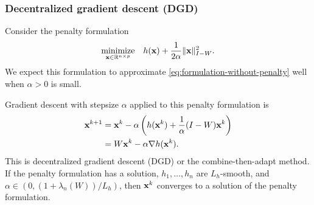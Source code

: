\documentclass[10pt,mathserif]{beamer}
\begin{document}
\begin{frame}
\frametitle{Decentralized gradient descent (DGD)}
Consider the penalty formulation
\[
\begin{array}{ll}
\underset{{\mathbf{x}}\in\mathbb{R}^{n\times p}}{\mbox{minimize}} &\displaystyle{h({\mathbf{x}}) + \frac{1}{2\alpha }\|{\mathbf{x}}\|^2_{I-W}}.
\end{array}
\]
We expect this formulation to approximate \eqref{eq:formulation-without-penalty} well when $\alpha>0$ is small.
\vspace{0.2in}

Gradient descent with stepsize $\alpha$ applied to this penalty formulation is
\begin{align*}
   {\mathbf{x}}^{k+1} & = {\mathbf{x}}^k -\alpha \left(h({\mathbf{x}}^k)+\frac{1}{\alpha}(I-W){\mathbf{x}}^k\right)\\
   & = W{\mathbf{x}}^k - \alpha \nabla h({\mathbf{x}}^k).
\end{align*}
This is decentralized gradient descent (DGD) or the combine-then-adapt method. 
If the penalty formulation has a solution, $h_1,\dots,h_n$ are $L_h$-smooth, and $\alpha \in (0,(1+\lambda_n(W))/L_h)$, then ${\mathbf{x}}^k$ converges to a solution of the penalty formulation.
\end{frame}
\end{document}
